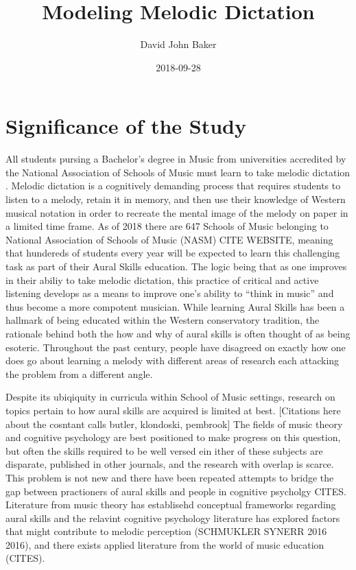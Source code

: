 \documentclass[]{book}
\title{Modeling Melodic Dictation}
\author{David John Baker}
\date{2018-09-28}
\theoremstyle{definition}
\theoremstyle{definition}
\theoremstyle{definition}
\theoremstyle{remark}
\begin{document}
\maketitle

{
\setcounter{tocdepth}{1}
\tableofcontents
}
\hypertarget{significance-of-the-study}{%
\chapter{Significance of the Study}\label{significance-of-the-study}}

All students pursing a Bachelor's degree in Music from universities
accredited by the National Association of Schools of Music must learn to
take melodic dictation \citep[ Section
VIII.6.B.2.A]{NationalAssociationSchools2018}. Melodic dictation is a
cognitively demanding process that requires students to listen to a
melody, retain it in memory, and then use their knowledge of Western
musical notation in order to recreate the mental image of the melody on
paper in a limited time frame. As of 2018 there are 647 Schools of Music
belonging to National Association of Schools of Music (NASM) CITE
WEBSITE, meaning that hundereds of students every year will be expected
to learn this challenging task as part of their Aural Skills education.
The logic being that as one improves in their abiliy to take melodic
dictation, this practice of critical and active listening develops as a
means to improve one's ability to ``think in music'' and thus become a
more compotent musician. While learning Aural Skills has been a hallmark
of being educated within the Western conservatory tradition, the
rationale behind both the how and why of aural skills is often thought
of as being esoteric. Throughout the past century, people have disagreed
on exactly how one does go about learning a melody with different areas
of research each attacking the problem from a different angle.

Despite its ubiqiquity in curricula within School of Music settings,
research on topics pertain to how aural skills are acquired is limited
at best. {[}Citations here about the cosntant calls butler, klondoski,
pembrook{]} The fields of music theory and cognitive psychology are best
positioned to make progress on this question, but often the skills
required to be well versed ein ither of these subjects are disparate,
published in other journals, and the research with overlap is scarce.
This problem is not new and there have been repeated attempts to bridge
the gap between practioners of aural skills and people in cognitive
psycholgy CITES. Literature from music theory has establisehd conceptual
frameworks regarding aural skills
\citet{karpinskiAuralSkillsAcquisition2000} and the relavint cognitive
psychology literature has explored factors that might contribute to
melodic perception (SCHMUKLER SYNERR 2016 2016), and there exists
applied literature from the world of music education (CITES).
\end{document}
